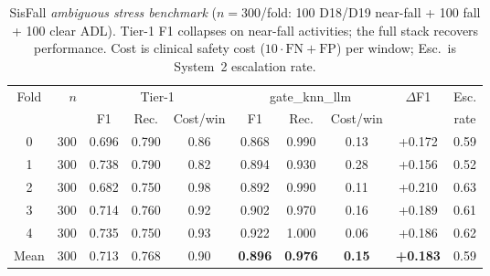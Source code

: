\begin{table}[!t]
\centering
\caption{SisFall \emph{ambiguous stress benchmark} ($n{=}300$/fold: 100 D18/D19 near-fall + 100 fall + 100 clear ADL). Tier-1 F1 collapses on near-fall activities; the full stack recovers performance. Cost is clinical safety cost ($10\cdot\mathrm{FN}+\mathrm{FP}$) per window; Esc.\ is System~2 escalation rate.}
\label{tab:ambiguoussisfall}
\begin{tabular}{c r ccc ccc cc}
\toprule
Fold & $n$ & \multicolumn{3}{c}{Tier-1} & \multicolumn{3}{c}{gate\_knn\_llm} & $\Delta$F1 & Esc. \\
\cmidrule(lr){3-5}\cmidrule(lr){6-8}
 & & F1 & Rec. & Cost/win & F1 & Rec. & Cost/win & & rate \\
\midrule
0 & 300 & 0.696 & 0.790 & 0.86 & 0.868 & 0.990 & 0.13 & +0.172 & 0.59 \\
1 & 300 & 0.738 & 0.790 & 0.82 & 0.894 & 0.930 & 0.28 & +0.156 & 0.52 \\
2 & 300 & 0.682 & 0.750 & 0.98 & 0.892 & 0.990 & 0.11 & +0.210 & 0.63 \\
3 & 300 & 0.714 & 0.760 & 0.92 & 0.902 & 0.970 & 0.16 & +0.189 & 0.61 \\
4 & 300 & 0.735 & 0.750 & 0.93 & 0.922 & 1.000 & 0.06 & +0.186 & 0.62 \\
\midrule
Mean & 300 & 0.713 & 0.768 & 0.90 & \textbf{0.896} & \textbf{0.976} & \textbf{0.15} & \textbf{+0.183} & 0.59 \\
\bottomrule
\end{tabular}
\end{table}
